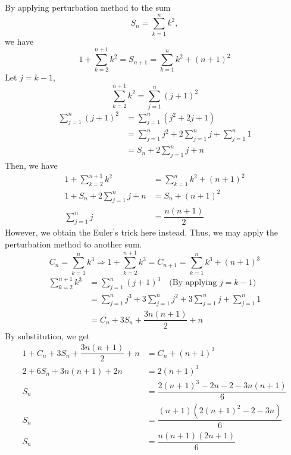 \newpage
\begin{eg}
	By applying perturbation method to the sum
	\[
		S_n = \sum_{k = 1}^n k^2,
	\]
	we have
	\[
		1 + \sum_{k = 2}^{n + 1} k^2 = S_{n + 1} = \sum_{k = 1}^n  k^2 + (n + 1)^2 
	\]
	Let \(j = k - 1\),
	\[
		\sum_{k = 2}^{n + 1} k^2 = \sum_{j = 1}^{n} (j + 1)^2
	\]
	\[
	\begin{aligned}
		\sum_{j = 1}^{n} (j + 1)^2 &= \sum_{j = 1}^n (j^2 + 2j + 1) \\
		&=  \sum_{j = 1}^n j^2 + 2\sum_{j = 1}^n j + \sum_{j = 1}^n 1 \\
		&= S_n + 2\sum_{j = 1}^n j + n
	\end{aligned}
	\]
	Then, we have
	\[
		\begin{aligned}
			1 + \sum_{k = 2}^{n + 1} k^2 &= \sum_{k = 1}^n  k^2 + (n + 1)^2 \\
			1 + S_n + 2\sum_{j = 1}^n j + n& = S_n + (n + 1)^2 \\
			\sum_{j = 1}^n j &= \dfrac{n(n + 1)}{2}
		\end{aligned}
	\]
	However, we obtain the Euler\(^{\prime}\)s trick here instead. Thus, we may apply the perturbation method to another sum.
	\[
		C_n = \sum_{k = 1}^n k^3 \Rightarrow 1 + \sum_{k = 2}^{n + 1} k^3 = C_{n + 1} = \sum_{k = 1}^n  k^3 + (n + 1)^3
	\]
	\[
		\begin{aligned}
			\sum_{k = 2}^{n + 1} k^3 &= \sum_{j = 1}^n (j + 1)^3 \quad\text{(By applying \(j = k - 1\))} \\
			&= \sum_{j = 1}^n j^3 + 3\sum_{j = 1}^n j^2 + 3\sum_{j = 1}^n j + \sum_{j = 1}^n 1 \\
			&= C_n + 3S_n + \dfrac{3n(n + 1)}{2} + n
		\end{aligned}
	\]
	By substitution, we get
	\[
	\begin{aligned}
		1 + C_n + 3S_n + \dfrac{3n(n + 1)}{2} + n &= C_n + (n + 1)^3 \\
		2 + 6S_n + 3n(n + 1) + 2n &= 2(n + 1)^3 \\
		S_n &= \dfrac{2(n + 1)^3 - 2n - 2 - 3n(n + 1)}{6} \\
		S_n &= \dfrac{(n + 1)(2(n + 1)^{2} - 2 - 3n )}{6} \\
		S_n &= \dfrac{n(n + 1)(2n + 1)}{6}
	\end{aligned}
	\]
\end{eg}
